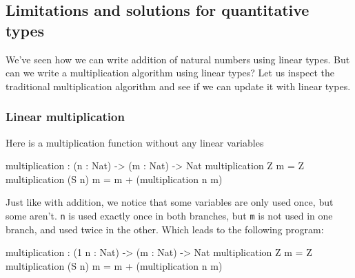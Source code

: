 \documentclass[
]{article}
\newenvironment{Shaded}{}{}
\newcommand{\DataTypeTok}[1]{\textcolor[rgb]{0.56,0.13,0.00}{#1}}
\newcommand{\DecValTok}[1]{\textcolor[rgb]{0.25,0.63,0.44}{#1}}
\newcommand{\NormalTok}[1]{#1}
\newcommand{\OperatorTok}[1]{\textcolor[rgb]{0.40,0.40,0.40}{#1}}
\newcommand{\OtherTok}[1]{\textcolor[rgb]{0.00,0.44,0.13}{#1}}
\begin{document}
\hypertarget{limitations-and-solutions-for-quantitative-types}{%
\subsection{Limitations and solutions for quantitative
types}\label{limitations-and-solutions-for-quantitative-types}}

We've seen how we can write addition of natural numbers using linear
types. But can we write a multiplication algorithm using linear types?
Let us inspect the traditional multiplication algorithm and see if we
can update it with linear types.

\hypertarget{linear-multiplication}{%
\subsubsection{Linear multiplication}\label{linear-multiplication}}

Here is a multiplication function without any linear variables

\begin{Shaded}
\begin{Highlighting}[]
\NormalTok{multiplication }\OperatorTok{:}\NormalTok{ (n }\OperatorTok{:} \DataTypeTok{Nat}\NormalTok{) }\OtherTok{{-}\textgreater{}}\NormalTok{ (m }\OperatorTok{:} \DataTypeTok{Nat}\NormalTok{) }\OtherTok{{-}\textgreater{}} \DataTypeTok{Nat}
\NormalTok{multiplication }\DataTypeTok{Z}\NormalTok{ m }\OtherTok{=} \DataTypeTok{Z} 
\NormalTok{multiplication (}\DataTypeTok{S}\NormalTok{ n) m }\OtherTok{=}\NormalTok{ m }\OperatorTok{+}\NormalTok{ (multiplication n m)}
\end{Highlighting}
\end{Shaded}

Just like with addition, we notice that some variables are only used
once, but some aren't. \texttt{n} is used exactly once in both branches,
but \texttt{m} is not used in one branch, and used twice in the other.
Which leads to the following program:

\begin{Shaded}
\begin{Highlighting}[]
\NormalTok{ multiplication }\OperatorTok{:}\NormalTok{ (}\DecValTok{1}\NormalTok{ n }\OperatorTok{:} \DataTypeTok{Nat}\NormalTok{) }\OtherTok{{-}\textgreater{}}\NormalTok{ (m }\OperatorTok{:} \DataTypeTok{Nat}\NormalTok{) }\OtherTok{{-}\textgreater{}} \DataTypeTok{Nat}
\NormalTok{ multiplication }\DataTypeTok{Z}\NormalTok{ m }\OtherTok{=} \DataTypeTok{Z}
\NormalTok{ multiplication (}\DataTypeTok{S}\NormalTok{ n) m }\OtherTok{=}\NormalTok{ m }\OperatorTok{+}\NormalTok{ (multiplication n m)}
\end{Highlighting}
\end{Shaded}
\end{document}
